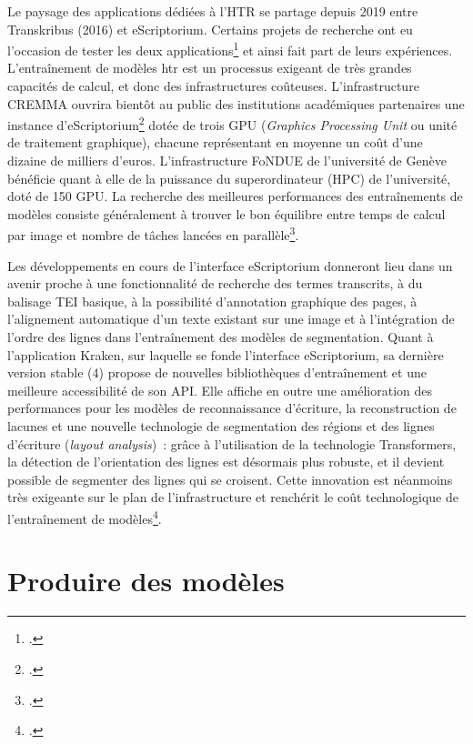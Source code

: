 \documentclass[a4paper,12pt,twoside]{book}
\begin{document}
		Le paysage des applications dédiées à l'HTR se partage depuis 2019 entre
		Transkribus (2016) et eScriptorium. Certains projets de recherche ont eu
		l'occasion de tester les deux applications\footcite{leblancTranskribusEScriptoriumRetour2022, paupeCursive17eSiecle2022a} et ainsi fait part de leurs
		expériences. L'entraînement de modèles \gls{htr} est un processus exigeant de
		très grandes capacités de calcul, et donc des infrastructures coûteuses.
		L'infrastructure CREMMA ouvrira bientôt au public des institutions
		académiques partenaires une instance d'eScriptorium\footcite{marguin-hamonDiscoursOuverturePresentation2022} dotée de trois GPU
		(\textit{Graphics Processing Unit} ou unité de traitement graphique),
		chacune représentant en moyenne un coût d'une dizaine de milliers
		d'euros. L'infrastructure FoNDUE de l'université de Genève bénéficie
		quant à elle de la puissance du superordinateur (HPC) de l'université,
		doté de 150 GPU. La recherche des meilleures performances des
		entraînements de modèles consiste généralement à trouver le bon
		équilibre entre temps de calcul par image et nombre de tâches lancées en
		parallèle\footcite{gabayFoNDUELightweightHTR2022}.
		
		Les développements en cours de l'interface eScriptorium donneront lieu
		dans un avenir proche à une fonctionnalité de recherche des termes
		transcrits, à du balisage TEI basique, à la possibilité d'annotation
		graphique des pages, à l'alignement automatique d'un texte existant sur
		une image et à l'intégration de l'ordre des lignes dans l'entraînement
		des modèles de segmentation. Quant à l'application Kraken, sur laquelle
		se fonde l'interface eScriptorium, sa dernière version stable (4)
		propose de nouvelles bibliothèques d'entraînement et une meilleure
		accessibilité de son API. Elle affiche en outre une amélioration des
		performances pour les modèles de reconnaissance d'écriture, la
		reconstruction de lacunes et une nouvelle technologie de segmentation
		des régions et des lignes d'écriture (\textit{layout analysis})~: grâce à
		l'utilisation de la technologie Transformers, la détection de
		l'orientation des lignes est désormais plus robuste, et il devient
		possible de segmenter des lignes qui se croisent. Cette innovation est
		néanmoins très exigeante sur le plan de l'infrastructure et renchérit le
		coût technologique de l'entraînement de modèles\footcite{kiesslingNewDevelopmentsKraken2022}.
		
		\section{Produire des modèles}
		
\end{document}
